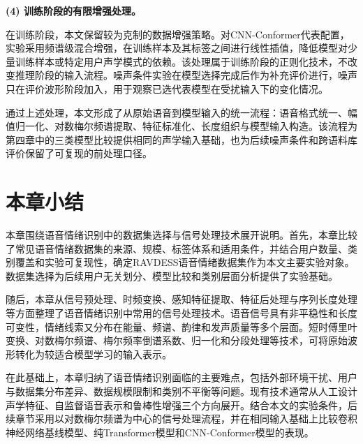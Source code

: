 \textbf{(4) 训练阶段的有限增强处理。}

在训练阶段，本文保留较为克制的数据增强策略。对CNN-Conformer代表配置，实验采用频谱级混合增强，在训练样本及其标签之间进行线性插值，降低模型对少量训练样本或特定用户声学模式的依赖。该处理属于训练阶段的正则化技术，不改变推理阶段的输入流程。噪声条件实验在模型选择完成后作为补充评价进行，噪声只在评价波形阶段加入，用于观察已选代表模型在受扰输入下的变化情况\cite{kang2023labelmixup,leem2024selective,zhou2020using}。

通过上述处理，本文形成了从原始语音到模型输入的统一流程：语音格式统一、幅值归一化、对数梅尔频谱提取、特征标准化、长度组织与模型输入构造。该流程为第四章中的三类模型比较提供相同的声学输入基础，也为后续噪声条件和跨语料库评价保留了可复现的前处理口径。





\section{本章小结}

本章围绕语音情绪识别中的数据集选择与信号处理技术展开说明。首先，本章比较了常见语音情绪数据集的来源、规模、标签体系和适用条件，并结合用户数量、类别覆盖和实验可复现性，确定RAVDESS语音情绪数据集作为本文主要实验对象。数据集选择为后续用户无关划分、模型比较和类别层面分析提供了实验基础。

随后，本章从信号预处理、时频变换、感知特征提取、特征后处理与序列长度处理等方面整理了语音情绪识别中常用的信号处理技术。语音信号具有非平稳性和长度可变性，情绪线索又分布在能量、频谱、韵律和发声质量等多个层面。短时傅里叶变换、对数梅尔频谱、梅尔频率倒谱系数、归一化和分段处理等技术，可将原始波形转化为较适合模型学习的输入表示。

在此基础上，本章归纳了语音情绪识别面临的主要难点，包括外部环境干扰、用户与数据集分布差异、数据规模限制和类别不平衡等问题。现有技术通常从人工设计声学特征、自监督语音表示和鲁棒性增强三个方向展开。结合本文的实验条件，后续章节采用以对数梅尔频谱为中心的信号处理流程，并在相同输入基础上比较卷积神经网络基线模型、纯Transformer模型和CNN-Conformer模型的表现。
